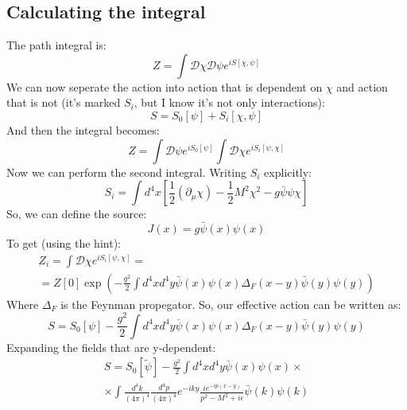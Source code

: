 \documentclass{article}
\begin{document}
\subsection{Calculating the integral}
The path integral is:
\begin{equation}
    Z = \int \mathcal{D}\chi\mathcal{D}\psi e^{iS[\chi,\psi]}
\end{equation}
We can now seperate the action into action that is dependent on $\chi$ and action that is not (it's marked $S_i$, but I know it's not only interactions):
\begin{equation}
    S = S_0[\psi] + S_i[\chi,\psi]
\end{equation}
And then the integral becomes:
\begin{equation}
    Z = \int \mathcal{D}\psi e^{iS_0[\psi]} \int \mathcal{D}\chi e^{iS_i[\psi, \chi]}
\end{equation}
Now we can perform the second integral. Writing $S_i$ explicitly:
\begin{equation}
    S_i = \int d^4x \left[
        \frac{1}{2}\left(\partial_\mu\chi\right) - \frac{1}{2}M^2\chi^2 - g\bar{\psi}\psi\chi
    \right]
\end{equation}
So, we can define the source:
\begin{equation}
    J(x) = g\bar{\psi}(x)\psi(x)
\end{equation}
To get (using the hint):
\begin{equation}
\begin{gathered}
    Z_i = \int \mathcal{D}\chi e^{iS_i[\psi, \chi]} = \\ = Z[0]\exp(-\frac{g^2}{2}\int d^4x d^4y \bar{\psi}(x)\psi(x) \Delta_F(x - y)\bar{\psi}(y)\psi(y))
\end{gathered}
\end{equation}
Where $\Delta_F$ is the Feynman propegator. So, our effective action can be written as:
\begin{equation}
    S = S_0[\psi] - \frac{g^2}{2}\int d^4x d^4y \bar{\psi}(x)\psi(x) \Delta_F(x - y)\bar{\psi}(y)\psi(y)
\end{equation}
Expanding the fields that are y-dependent:
\begin{equation}
\begin{gathered}
    S = S_0[\tilde{\psi}] - \frac{g^2}{2}\int d^4x d^4y\bar{\psi}(x)\psi(x) \times \\ \times \int \frac{d^4k}{(4\pi)^4}\frac{d^4p}{(4\pi)^4} e^{-iky} \frac{ie^{-ip(x - y)}}{p^2 - M^2 + i\epsilon}\bar{\psi}(k)\psi(k)
\end{gathered}
\end{equation}
\end{document}

